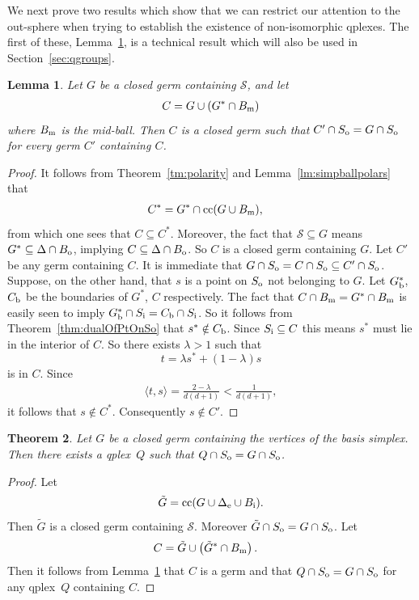 \documentclass[aps,pra,superscriptaddress,10pt,tightenlines,twocolumn,nofootinbib]{revtex4}
\newtheorem{theorem}{Theorem}
\newtheorem{lemma}[theorem]{Lemma}
\theoremstyle{remark}
\newcommand{\be}{\begin{equation}}
\newcommand{\ee}{\end{equation}}
\newcommand{\ea}[1]{\begin{align}#1\end{align}}
\newcommand{\la}{\langle}
\newcommand{\ra}{\rangle}
\newcommand{\bs}{\Delta_{\rm{e}}}
\newcommand{\ps}{\Delta}
\newcommand{\dl}[1]{#1^{*}}
\newcommand{\bo}{B_{\rm{o}}}
\newcommand{\bi}{B_{\rm{i}}}
\newcommand{\midball}{B_{\rm m}}
\newcommand{\so}{S_{\rm{o}}}
\newcommand{\si}{S_{\rm{i}}}
\newcommand{\qp}{Q}
\newcommand{\pr}{G}
\newcommand{\qplex}{qplex}
\newcommand{\qplexes}{qplexes}
\newcommand{\stm}{\mathscr{S}}
\DeclareMathOperator{\cc}{cc}
\begin{document}
We next prove two results which show that we can restrict our attention to the out-sphere when trying to establish the existence of non-isomorphic \qplexes.  The first of these, Lemma~\ref{lm:extendSoconst}, is a technical result which will also be used in Section~\ref{sec:qgroups}.
\begin{lemma}
\label{lm:extendSoconst}
Let $\pr$ be a closed germ containing $\stm$, and let
\ea{
C = \pr \cup (\dl{\pr}\cap \midball)
}
where $\midball$ is the mid-ball.  Then $C$ is a closed germ such that  $C'\cap \so = \pr \cap \so$ for every germ $C'$ containing $C$.
\end{lemma}
\begin{proof}
It follows from Theorem~\ref{tm:polarity} and Lemma~\ref{lm:simpballpolars} that
\ea{
\dl{C} &=  \dl{\pr} \cap \cc(\pr \cup \midball),
}
from which one  sees that $C\subseteq \dl{C}$. Moreover, the fact that $\stm \subseteq \pr$ means $\dl{\pr} \subseteq \ps \cap \bo$, implying $C\subseteq \ps\cap\bo$.  So $C$ is a closed germ containing $\pr$.  Let $C'$ be any germ containing $C$.   It is immediate that $\pr\cap \so = C \cap \so \subseteq C'\cap\so$.  Suppose, on the other hand, that $s$ is a point on $\so$ not belonging to $\pr$.  Let $\dl{\pr}_{\rm{b}}$,  $C_{\rm{b}}$ be the boundaries of $\dl{\pr}$, $C$ respectively.  The fact that $C\cap \midball = \dl{\pr}\cap \midball$ is easily seen to imply  $\dl{\pr}_{\rm{b}}\cap \si = C_{\rm{b}}\cap\si$.  So  it follows from  Theorem~\ref{thm:dualOfPtOnSo} that $\dl{s}\notin C_{\rm{b}}$. Since $\si \subseteq C$ this means  $\dl{s}$ must lie in the interior of $C$.  So there exists $\lambda > 1$ such that
\be
t = \lambda \dl{s} + (1-\lambda) s
\ee
is in $C$.  Since
\ea{
\la t, s \ra  =\frac{2-\lambda}{d(d+1)} < \frac{1}{d(d+1)},
}
it follows that  $s \notin \dl{C}$.  Consequently $s\notin C'$.
\end{proof}
\begin{theorem}
\label{thm:bdryTheoremA}
Let $\pr$ be a closed germ containing the vertices of the basis simplex.  Then there exists a \qplex\ $\qp$ such that $\qp\cap \so=\pr\cap \so$.
\end{theorem}
\begin{proof}
Let
\ea{
\tilde{\pr} = \cc(\pr\cup \bs \cup \bi).
}
Then $\tilde{\pr}$ is a closed germ containing $\stm$.  Moreover $\tilde{\pr}\cap \so = \pr \cap \so$.  Let
\ea{
C &= \tilde{\pr} \cup \left(\dl{\tilde{\pr}}\cap \midball\right).
}
Then it follows from  Lemma~\ref{lm:extendSoconst} that $C$ is a germ and that $\qp\cap \so = \pr\cap \so$ for any \qplex\ $\qp$ containing $C$.
\end{proof}
\end{document}
